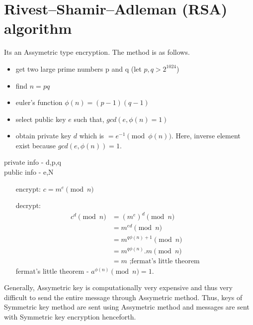 \documentclass[english, 11pt]{article}
\begin{document}
\begin{figure}[ht]


  \centering   
\end{figure}

\section*{Rivest–Shamir–Adleman (RSA) algorithm}
Its an Assymetric type encryption. The method is as follows.
\begin{itemize}
  \item get two large prime numbers p and q (let $p,q > 2^{1024}$)
  \item find $n = pq$
  \item euler's function $\phi(n) = (p-1)(q-1)$
  \item select public key $e$ such that, $gcd(e,\phi(n) = 1)$
  \item obtain private key $d$ which is $= e^{-1} \pmod{\phi(n)} $. Here, inverse element exist because $gcd(e,\phi(n)) = 1$.
\end{itemize}
private info - d,p,q \\
public info - e,N
\begin{itemize}
  \item[encrypt:] $c = m^e \pmod{n}$
  \item[decrypt:] 
  \begin{align*}
    c^d \pmod{n} &= (m^e)^d \pmod{n} \\
    &= m^{ed} \pmod{n} \\
    &= m^{q\phi(n) + 1} \pmod{n} \\
    &= m^{q\phi(n)}.m \pmod{n} \\
    &= m \text{      ;fermat's little theorem}
  \end{align*}
  fermat's little theorem - $a^{\phi(n)} \pmod{n} = 1$.
\end{itemize}
Generally, Assymetric key is computationally very expensive and thus very difficult to send the entire message through Assymetric method. Thus, keys of Symmetric key method are sent using Assymetric method and messages are sent with Symmetric key encryption henceforth.
\end{document}
